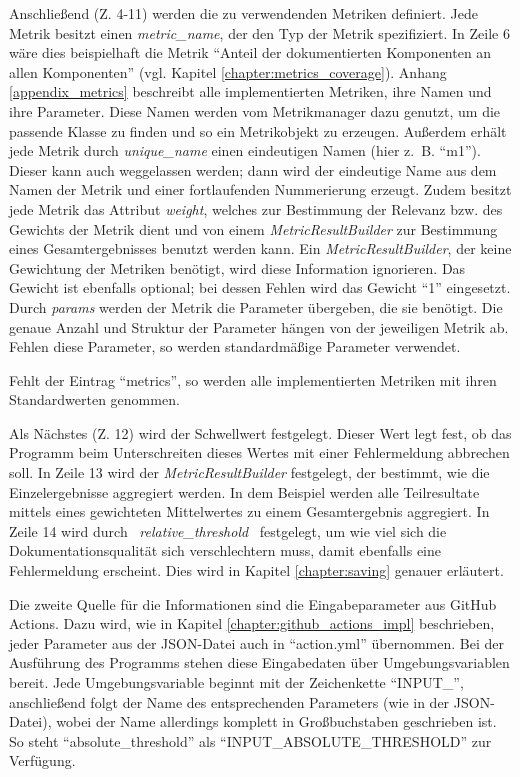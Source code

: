 Anschließend (Z. 4-11) werden die zu verwendenden Metriken definiert. Jede Metrik besitzt einen \textit{metric\_name}, der den Typ der Metrik spezifiziert. In Zeile 6 wäre dies beispielhaft die Metrik \enquote{Anteil der dokumentierten Komponenten an allen Komponenten} (vgl. Kapitel \ref{chapter:metrics_coverage}). Anhang  \ref{appendix_metrics} beschreibt alle implementierten Metriken, ihre Namen und ihre Parameter. Diese Namen werden vom Metrikmanager dazu genutzt, um die passende Klasse zu finden und so ein Metrikobjekt zu erzeugen. Außerdem erhält jede Metrik durch \textit{unique\_name} einen eindeutigen Namen (hier z.~B. \enquote{m1}). Dieser kann auch weggelassen werden; dann wird der eindeutige Name aus dem Namen der Metrik und einer fortlaufenden Nummerierung erzeugt. Zudem besitzt jede Metrik das Attribut \textit{weight}, welches zur Bestimmung der Relevanz bzw. des Gewichts der Metrik dient und von einem \textit{MetricResultBuilder} zur Bestimmung eines Gesamtergebnisses benutzt werden kann. Ein \textit{MetricResultBuilder}, der keine Gewichtung der Metriken benötigt, wird diese Information ignorieren. Das Gewicht ist ebenfalls optional; bei dessen Fehlen wird das Gewicht \enquote{1} eingesetzt.  Durch \textit{params}  werden der Metrik die Parameter übergeben, die sie benötigt. Die genaue Anzahl und Struktur der Parameter hängen von der jeweiligen Metrik ab. Fehlen diese Parameter, so werden standardmäßige Parameter verwendet.

Fehlt der Eintrag \enquote{metrics}, so werden alle implementierten Metriken mit ihren Standardwerten genommen.

Als Nächstes (Z. 12) wird der Schwellwert festgelegt. Dieser Wert legt fest, ob das Programm beim Unterschreiten dieses Wertes mit einer Fehlermeldung abbrechen soll. In Zeile 13 wird der \textit{MetricResultBuilder} festgelegt, der bestimmt, wie die Einzelergebnisse aggregiert werden. In dem Beispiel werden alle Teilresultate mittels eines gewichteten Mittelwertes zu einem Gesamtergebnis aggregiert.  In Zeile 14 wird durch \mbox{\textit{ relative\_threshold }} festgelegt, um wie viel sich die Dokumentationsqualität sich verschlechtern muss, damit ebenfalls eine Fehlermeldung erscheint. Dies wird in Kapitel \ref{chapter:saving} genauer erläutert.



\bigskip
Die zweite Quelle für die Informationen sind die Eingabeparameter aus GitHub Actions. Dazu wird, wie in Kapitel \ref{chapter:github_actions_impl} beschrieben, jeder Parameter aus der \ac{JSON}-Datei auch in \enquote{action.yml} übernommen. Bei der Ausführung des Programms stehen diese Eingabedaten über Umgebungsvariablen bereit. Jede Umgebungsvariable beginnt mit der Zeichenkette \enquote{INPUT\_}, anschließend folgt der Name des entsprechenden Parameters (wie in der \ac{JSON}-Datei), wobei der Name allerdings komplett in Großbuchstaben geschrieben ist. So steht  \enquote{absolute\_threshold} als \enquote{INPUT\_ABSOLUTE\_THRESHOLD} zur Verfügung.

